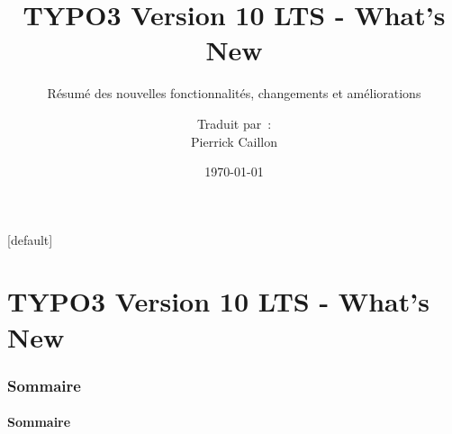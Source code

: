 \documentclass[t]{beamer}
\title{TYPO3 Version 10 LTS - What's New}
\subtitle{Résumé des nouvelles fonctionnalités, changements et améliorations}
\author{
	\centerline{Traduit par~:}
	\centerline{Pierrick Caillon}
}
\date{\today}
\begin{document}
\sharefont


\begingroup
	[default]
	\begin{frame}
		\titlepage
	\end{frame}
\endgroup


\section*{TYPO3 Version 10 LTS - What's New}
\begin{frame}[fragile]
	\frametitle{Sommaire}
	\framesubtitle{Sommaire}

	\tableofcontents

\end{frame}







% 
% 

% 



\end{document}
